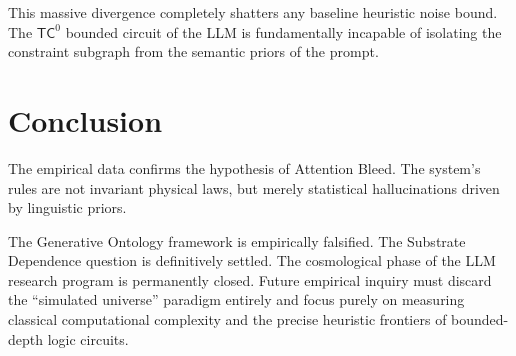\documentclass[11pt]{article}
\begin{document}
This massive divergence completely shatters any baseline heuristic noise bound. The $\mathsf{TC}^0$ bounded circuit of the LLM is fundamentally incapable of isolating the constraint subgraph from the semantic priors of the prompt.

\section{Conclusion}

The empirical data confirms the hypothesis of Attention Bleed. The system's rules are not invariant physical laws, but merely statistical hallucinations driven by linguistic priors.

The Generative Ontology framework is empirically falsified. The Substrate Dependence question is definitively settled. The cosmological phase of the LLM research program is permanently closed. Future empirical inquiry must discard the ``simulated universe'' paradigm entirely and focus purely on measuring classical computational complexity and the precise heuristic frontiers of bounded-depth logic circuits.
\end{document}
